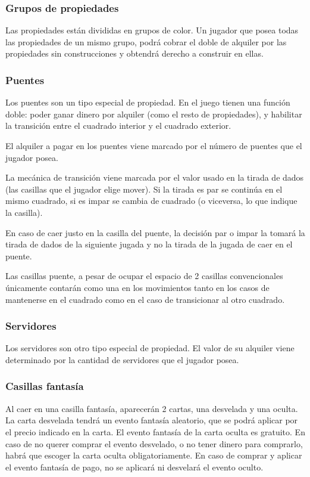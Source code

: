 \subsubsection{Grupos de propiedades}
Las propiedades están divididas en grupos de color. Un jugador que posea
todas las propiedades de un mismo grupo, podrá cobrar el doble de alquiler
por las propiedades sin construcciones
y obtendrá derecho a construir en ellas.


\subsubsection{Puentes}
Los puentes son un tipo especial de propiedad. En el juego tienen
una función doble: poder ganar dinero por alquiler (como el resto de 
propiedades), y habilitar la transición entre el cuadrado interior y el 
cuadrado exterior.

El alquiler a pagar en los puentes viene marcado por el número de 
puentes que el jugador posea.

La mecánica de transición viene marcada por el valor usado 
en la tirada de dados (las casillas que el jugador elige mover). Si la 
tirada es par se continúa en el mismo cuadrado, si es impar se cambia de 
cuadrado (o viceversa, lo que indique la casilla).

En caso de caer justo en la casilla del puente, la decisión par o impar 
la tomará la tirada de dados de la siguiente jugada y no la tirada de la jugada 
de caer en el puente.

Las casillas puente, a pesar de ocupar el espacio de 2 casillas convencionales
únicamente contarán como una en los movimientos tanto en los casos de 
mantenerse en el cuadrado como en el caso de transicionar al otro
cuadrado.

\subsubsection{Servidores}
Los servidores son otro tipo especial de propiedad. El valor de su 
alquiler viene determinado por la cantidad de servidores que 
el jugador posea.

\subsubsection{Casillas fantasía}
Al caer en una casilla fantasía, aparecerán 2 cartas, una desvelada y 
una oculta. La carta desvelada tendrá un evento fantasía aleatorio, que se podrá 
aplicar por el precio indicado en la carta. El evento fantasía de la 
carta oculta es gratuito.
En caso de no querer comprar el evento desvelado, o no tener dinero 
para comprarlo, habrá que escoger la carta oculta obligatoriamente.
En caso de comprar y aplicar el evento fantasía de pago, no se aplicará 
ni desvelará el evento oculto.

